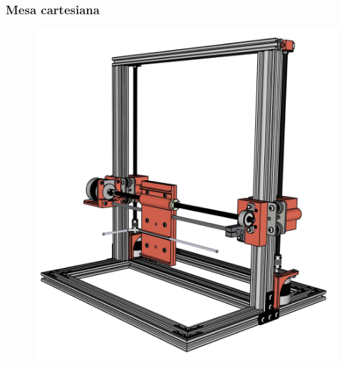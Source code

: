 \begin{frame}
    \frametitle{Mesa cartesiana}
        \begin{figure}
            \centering
            \includegraphics[scale = 0.1]{figuras/mesacartesianaperfil}
        \end{figure}
\end{frame}